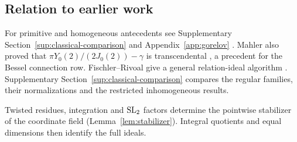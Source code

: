 \subsection{Relation to earlier work}
For primitive and homogeneous antecedents see Supplementary Section~\ref{sup:classical-comparison} and Appendix~\ref{app:gorelov}
\cite{Ostrowski1946,Kolchin1973,BBH1988,Gorelov2021}.
Mahler also proved that $\pi Y_0(2)/(2J_0(2))-\gamma$ is transcendental
\cite[Theorem~3 and its consequence, pp.~169--170]{Mahler1968},
a precedent for the Bessel connection row.
Fischler--Rivoal give a general relation-ideal algorithm
\cite[Theorem~4(i)--(ii), pp.~2--3 of the arXiv version]{FischlerRivoal2019}.
Supplementary Section~\ref{sup:classical-comparison} compares the regular families,
their normalizations and the restricted inhomogeneous results.

Twisted residues, integration and $\operatorname{SL}_2$ factors determine the pointwise
stabilizer of the coordinate field (Lemma~\ref{lem:stabilizer}).
Integral quotients and equal dimensions then identify the full ideals.
